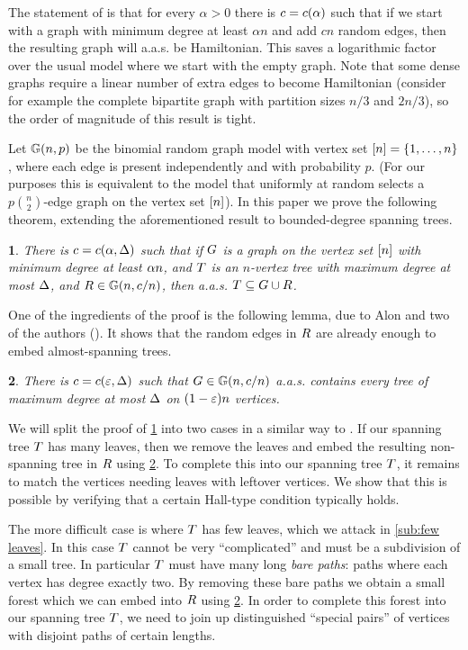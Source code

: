 \documentclass[11pt,english]{article}
\theoremstyle{plain}
\newtheorem{thm}{\protect\theoremname}
\theoremstyle{plain}
\theoremstyle{plain}
\newtheorem{lem}[thm]{\protect\lemmaname}
\theoremstyle{plain}
\theoremstyle{plain}
\theoremstyle{definition}
\theoremstyle{definition}
\theoremstyle{remark}
\theoremstyle{remark}
\theoremstyle{plain}
\newtheorem{mythm}{\protect\theoremname}
\renewenvironment{thm}{\begin{mythm}}{\end{mythm}}
\theoremstyle{definition}
\theoremstyle{definition}
\theoremstyle{plain}
\theoremstyle{plain}
\theoremstyle{plain}
\newtheorem{mylem}[mythm]{\protect\lemmaname}
\renewenvironment{lem}{\begin{mylem}}{\end{mylem}}
\theoremstyle{plain}
\theoremstyle{remark}
\theoremstyle{plain}
\theoremstyle{definition}
\let\originalleft\left
\let\originalright\right
\renewcommand{\left}{\mathopen{}\mathclose\bgroup\originalleft}
\renewcommand{\right}{\aftergroup\egroup\originalright}
\providecommand{\lemmaname}{Lemma}
\providecommand{\theoremname}{Theorem}
\begin{document}
The statement of \cite[Theorem~1]{BFM03} is that for every $\alpha>0$
there is $c=c\left(\alpha\right)$ such that if we start with a graph
with minimum degree at least $\alpha n$ and add $cn$ random edges,
then the resulting graph will a.a.s. be Hamiltonian. This saves a
logarithmic factor over the usual model where we start with the empty
graph. Note that some dense graphs require a linear number of extra
edges to become Hamiltonian (consider for example the complete bipartite
graph with partition sizes $n/3$ and $2n/3$), so the order of magnitude
of this result is tight.

Let $\GG\left(n,p\right)$ be the binomial random graph model with
vertex set $\range n=\left\{ 1,\dots,n\right\} $, where each edge
is present independently and with probability $p$. (For our purposes
this is equivalent to the model that uniformly at random selects a
$p{n \choose 2}$-edge graph on the vertex set $\range n$). In this
paper we prove the following theorem, extending the aforementioned
result to bounded-degree spanning trees.
\begin{thm}
\label{thm:main-theorem}There is $\c=\c\left(\a,\D\right)$ such
that if $G$ is a graph on the vertex set $\range n$ with minimum
degree at least $\alpha n$, and $T$ is an $n$-vertex tree with maximum
degree at most $\Delta$, and $\R\in\GG\left(n,\c/n\right)$, then a.a.s.
$T\subseteq G\cup R$.
\end{thm}
One of the ingredients of the proof is the following lemma, due to
Alon and two of the authors (\cite[Theorem~1.1]{AKS07}). It shows
that the random edges in $R$ are already enough to embed almost-spanning
trees.
\begin{lem}
\label{lem:almost-spanning}There is $\c=\c\left(\varepsilon,\D\right)$
such that $\G\in\GG\left(n,\c/n\right)$ a.a.s. contains every tree
of maximum degree at most $\Delta$ on $\left(1-\varepsilon\right)n$
vertices.
\end{lem}
We will split the proof of \ref{thm:main-theorem} into two cases
in a similar way to \cite{Kri10}. If our spanning tree $T$ has
many leaves, then we remove the leaves and embed the resulting non-spanning
tree in $R$ using \ref{lem:almost-spanning}. To complete this into
our spanning tree $T$, it remains to match the vertices needing
leaves with leftover vertices. We show that this is possible by verifying
that a certain Hall-type condition typically holds.

The more difficult case is where $T$ has few leaves, which we attack
in \ref{sub:few leaves}. In this case $T$ cannot be very ``complicated''
and must be a subdivision of a small tree. In particular $T$ must
have many long \emph{bare paths}: paths where each vertex has degree
exactly two. By removing these bare paths we obtain a small forest
which we can embed into $R$ using \ref{lem:almost-spanning}. In
order to complete this forest into our spanning tree $T$, we need
to join up distinguished ``special pairs'' of vertices with disjoint
paths of certain lengths.
\end{document}
